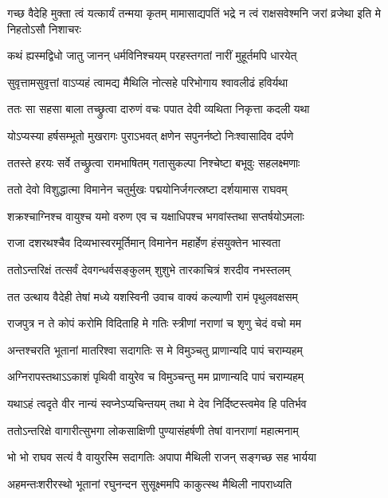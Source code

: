 \threelineshloka
{गच्छ वैदेहि मुक्ता त्वं यत्कार्यं तन्मया कृतम्}
{मामासाद्यपतिं भद्रे न त्वं राक्षसवेश्मनि}
{जरां व्रजेथा इति मे निहतोऽसौ निशाचरः}


\twolineshloka
{कथं ह्यस्मद्विधो जातु जानन् धर्मविनिश्चयम्}
{परहस्तगतां नारीं मुहूर्तमपि धारयेत्}


\twolineshloka
{सुवृत्तामसुवृत्तां वाऽप्यहं त्वामद्य मैथिलि}
{नोत्सहे परिभोगाय श्वावलीढं हविर्यथा}


\twolineshloka
{ततः सा सहसा बाला तच्छ्रुत्वा दारुणं वचः}
{पपात देवी व्यथिता निकृत्ता कदली यथा}


\twolineshloka
{योऽप्यस्या हर्षसम्भूतो मुखरागः पुराऽभवत्}
{क्षणेन सपुनर्नष्टो निःश्वासादिव दर्पणे}


\twolineshloka
{ततस्ते हरयः सर्वे तच्छ्रुत्वा रामभाषितम्}
{गतासुकल्पा निश्चेष्टा बभूवुः सहलक्ष्मणाः}


\twolineshloka
{ततो देवो विशुद्धात्मा विमानेन चतुर्मुखः}
{पद्मयोनिर्जगत्स्रष्टा दर्शयामास राघवम्}


\twolineshloka
{शक्रश्चाग्निश्च वायुश्च यमो वरुण एव च}
{यक्षाधिपश्च भगवांस्तथा सप्तर्षयोऽमलाः}


\twolineshloka
{राजा दशरथश्चैव दिव्यभास्वरमूर्तिमान्}
{विमानेन महार्हेण हंसयुक्तेन भास्वता}


\twolineshloka
{ततोऽन्तरिक्षं तत्सर्वं देवगन्धर्वसङ्कुलम्}
{शुशुभे तारकाचित्रं शरदीव नभस्तलम्}


\twolineshloka
{तत उत्थाय वैदेही तेषां मध्ये यशस्विनी}
{उवाच वाक्यं कल्याणी रामं पृथुलवक्षसम्}


\twolineshloka
{राजपुत्र न ते कोपं करोमि विदिताहि मे}
{गतिः स्त्रीणां नराणां च शृणु चेदं वचो मम}


\twolineshloka
{अन्तश्चरति भूतानां मातरिश्वा सदागतिः}
{स मे विमुञ्चतु प्राणान्यदि पापं चराम्यहम्}


\twolineshloka
{अग्निरापस्तथाऽऽकाशं पृथिवी वायुरेव च}
{विमुञ्चन्तु मम प्राणान्यदि पापं चराम्यहम्}


\twolineshloka
{यथाऽहं त्वदृते वीर नान्यं स्वप्नेऽप्यचिन्तयम्}
{तथा मे देव निर्दिष्टस्त्वमेव हि पतिर्भव}


\twolineshloka
{ततोऽन्तरिक्षे वागारीत्सुभगा लोकसाक्षिणी}
{पुण्यासंहर्षणी तेषां वानराणां महात्मनाम्}


\twolineshloka
{भो भो राघव सत्यं वै वायुरस्मि सदागतिः}
{अपापा मैथिली राजन् सङ्गच्छ सह भार्यया}


\twolineshloka
{अहमन्तःशरीरस्थो भूतानां रघुनन्दन}
{सुसूक्ष्ममपि काकुत्स्थ मैथिली नापराध्यति}

